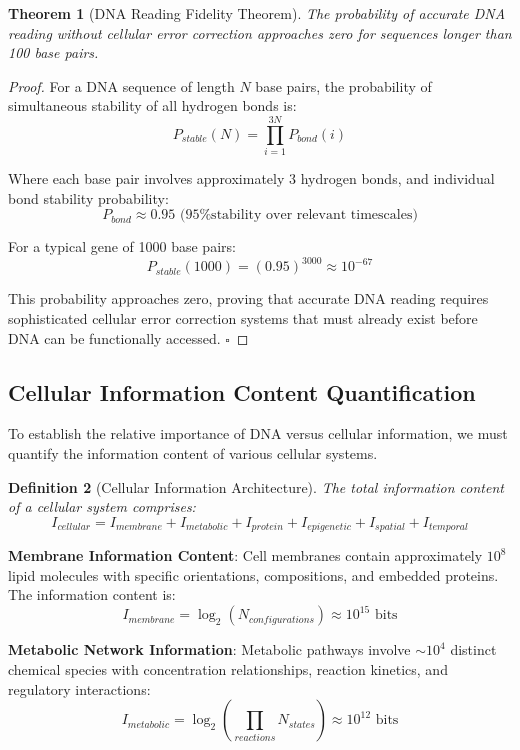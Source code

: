 \documentclass[12pt,a4paper]{article}
\newtheorem{theorem}{Theorem}[section]
\newtheorem{definition}[theorem]{Definition}
\begin{document}
\begin{theorem}[DNA Reading Fidelity Theorem]
The probability of accurate DNA reading without cellular error correction approaches zero for sequences longer than 100 base pairs.
\end{theorem}

\begin{proof}
For a DNA sequence of length $N$ base pairs, the probability of simultaneous stability of all hydrogen bonds is:
$$P_{stable}(N) = \prod_{i=1}^{3N} P_{bond}(i)$$

Where each base pair involves approximately 3 hydrogen bonds, and individual bond stability probability:
$$P_{bond} \approx 0.95 \text{ (95\% stability over relevant timescales)}$$

For a typical gene of 1000 base pairs:
$$P_{stable}(1000) = (0.95)^{3000} \approx 10^{-67}$$

This probability approaches zero, proving that accurate DNA reading requires sophisticated cellular error correction systems that must already exist before DNA can be functionally accessed. $\square$
\end{proof}

\subsection{Cellular Information Content Quantification}

To establish the relative importance of DNA versus cellular information, we must quantify the information content of various cellular systems.

\begin{definition}[Cellular Information Architecture]
The total information content of a cellular system comprises:
$$I_{cellular} = I_{membrane} + I_{metabolic} + I_{protein} + I_{epigenetic} + I_{spatial} + I_{temporal}$$
\end{definition}

\textbf{Membrane Information Content}: 
Cell membranes contain approximately $10^8$ lipid molecules with specific orientations, compositions, and embedded proteins. The information content is:
$$I_{membrane} = \log_2(N_{configurations}) \approx 10^{15} \text{ bits}$$

\textbf{Metabolic Network Information}:
Metabolic pathways involve $\sim 10^4$ distinct chemical species with concentration relationships, reaction kinetics, and regulatory interactions:
$$I_{metabolic} = \log_2(\prod_{reactions} N_{states}) \approx 10^{12} \text{ bits}$$
\end{document}
